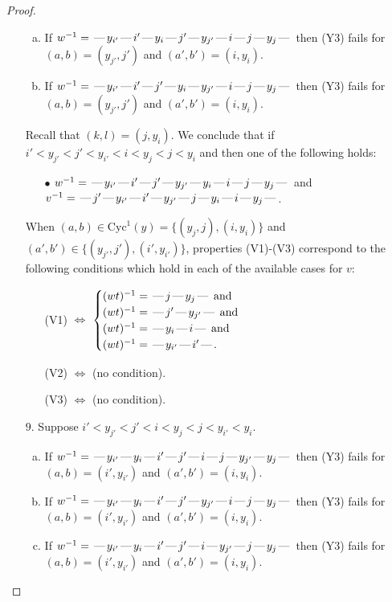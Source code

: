 \documentclass[10pt]{article}
\theoremstyle{definition}
\theoremstyle{definition}
\def\dash{\text{\hspace{0.5mm}---\hspace{0.5mm}}}
\def\Cyc{\mathrm{Cyc}}
\begin{document}
\begin{proof}
\begin{enumerate}
\begin{enumerate}[(a)]
\item If $w^{-1} = \dash y_{i'}\dash i'\dash y_i\dash j'\dash y_{j'}\dash i\dash j\dash y_j\dash $ then (Y3) fails for $(a,b)=(y_{j'},j')$ and $(a',b')=(i,y_i)$.
\item If $w^{-1} = \dash y_{i'}\dash i'\dash j'\dash y_i\dash y_{j'}\dash i\dash j\dash y_j\dash $ then (Y3) fails for $(a,b)=(y_{j'},j')$ and $(a',b')=(i,y_i)$.
\end{enumerate}
Recall that $(k,l) = (j,y_i)$.
We conclude that if $i' < y_{j'} < j' < y_{i'} < i < y_j < j < y_i$ and then one of the following holds:
\begin{enumerate}
\item[$\bullet$] $w^{-1} = \dash y_{i'}\dash i'\dash j'\dash y_{j'}\dash y_i\dash i\dash j\dash y_j\dash $ and $v^{-1} = \dash j'\dash y_{i'}\dash i'\dash y_{j'}\dash j\dash y_i\dash i\dash y_j\dash $.
\end{enumerate}
When $(a,b)\in\Cyc^1(y)=\{(y_j,j),(i,y_i)\}$ and $(a',b')\in\{(y_{j'},j'),(i',y_{i'})\}$,
properties (V1)-(V3) correspond to the following conditions which hold in
each of the available cases for $v$:
\begin{enumerate}
\item[](V1) $\Leftrightarrow$ $\begin{cases}\text{$(wt)^{-1} = \dash j \dash y_j \dash$}\text{ and }\\
\text{$(wt)^{-1} = \dash j' \dash y_{j'} \dash$}\text{ and }\\
\text{$(wt)^{-1} = \dash y_i \dash i \dash$}\text{ and }\\
\text{$(wt)^{-1} = \dash y_{i'} \dash i' \dash$}.\end{cases}$
\item[](V2) $\Leftrightarrow$ (no condition).
\item[](V3) $\Leftrightarrow$ (no condition).
\end{enumerate}
\item[$9$.] Suppose $i' < y_{j'} < j' < i < y_j < j < y_{i'} < y_i$.
\begin{enumerate}[(a)]
\item If $w^{-1} = \dash y_{i'}\dash y_i\dash i'\dash j'\dash i\dash j\dash y_{j'}\dash y_j\dash $ then (Y3) fails for $(a,b)=(i',y_{i'})$ and $(a',b')=(i,y_i)$.
\item If $w^{-1} = \dash y_{i'}\dash y_i\dash i'\dash j'\dash y_{j'}\dash i\dash j\dash y_j\dash $ then (Y3) fails for $(a,b)=(i',y_{i'})$ and $(a',b')=(i,y_i)$.
\item If $w^{-1} = \dash y_{i'}\dash y_i\dash i'\dash j'\dash i\dash y_{j'}\dash j\dash y_j\dash $ then (Y3) fails for $(a,b)=(i',y_{i'})$ and $(a',b')=(i,y_i)$.

\end{enumerate}
\end{enumerate}
\end{proof}
\end{document}

